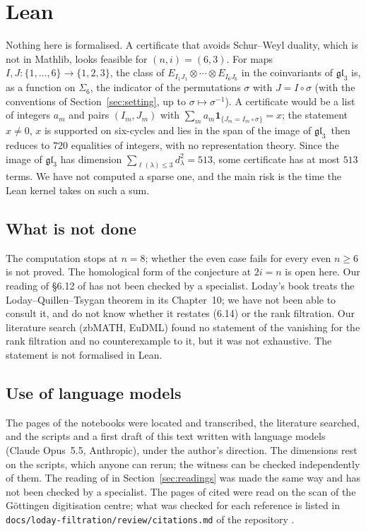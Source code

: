 \documentclass[11pt,a4paper]{amsart}
\theoremstyle{definition}
\theoremstyle{remark}
\newcommand{\q}[1]{\guillemotleft\,#1\,\guillemotright}
\newcommand{\gl}{\mathfrak{gl}}
\begin{document}
\section{Lean}\label{sec:lean}

Nothing here is formalised. A certificate that avoids Schur--Weyl duality, which is not in Mathlib, looks feasible for $(n, i) = (6, 3)$. For maps $I, J \colon \{1, \dots, 6\} \to \{1, 2, 3\}$, the class of $E_{I_1J_1} \otimes \cdots \otimes E_{I_6J_6}$ in the coinvariants of $\gl_3$ is, as a function on $\Sigma_6$, the indicator of the permutations $\sigma$ with $J = I \circ \sigma$ (with the conventions of Section~\ref{sec:setting}, up to $\sigma \mapsto \sigma^{-1}$). A certificate would be a list of integers $a_m$ and pairs $(I_m, J_m)$ with $\sum_m a_m \mathbf 1_{\{J_m = I_m \circ \sigma\}} = x$; the statement \q{$x \ne 0$, $x$ is supported on six-cycles and lies in the span of the image of $\gl_3$} then reduces to $720$ equalities of integers, with no representation theory. Since the image of $\gl_3$ has dimension $\sum_{\ell(\lambda) \le 3} d_\lambda^2 = 513$, some certificate has at most $513$ terms. We have not computed a sparse one, and the main risk is the time the Lean kernel takes on such a sum.

\subsection*{What is not done}
The computation stops at $n = 8$; whether the even case fails for every even $n \ge 6$ is not proved. The homological form of the conjecture at $2i = n$ is open here. Our reading of \S6.12 of \cite{lq} has not been checked by a specialist. Loday's book \cite{loday} treats the Loday--Quillen--Tsygan theorem in its Chapter~10; we have not been able to consult it, and do not know whether it restates (6.14) or the rank filtration. Our literature search (zbMATH, EuDML) found no statement of the vanishing for the rank filtration and no counterexample to it, but it was not exhaustive. The statement is not formalised in Lean.

\subsection*{Use of language models}
The pages of the notebooks were located and transcribed, the literature searched, and the scripts and a first draft of this text written with language models (Claude Opus~5.5, Anthropic), under the author's direction. The dimensions rest on the scripts, which anyone can rerun; the witness can be checked independently of them. The reading of \cite{lq} in Section~\ref{sec:readings} was made the same way and has not been checked by a specialist. The pages of \cite{lq} cited were read on the scan of the Göttingen digitisation centre; what was checked for each reference is listed in \texttt{docs/loday-filtration/review/citations.md} of the repository \cite{repo}.
\end{document}

